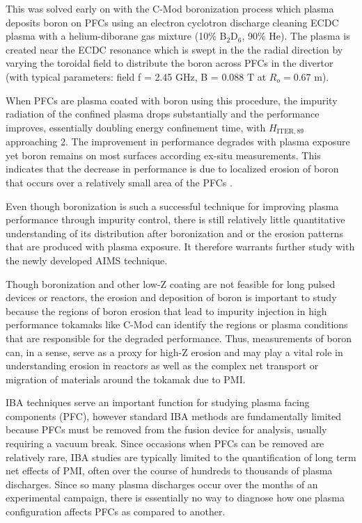 \documentclass[11pt,a4paper,twocolumn]{article}
\begin{document}
This was solved early on with the C-Mod boronization process which plasma deposits boron on PFCs using an electron cyclotron discharge cleaning ECDC plasma with a helium-diborane gas mixture (10\% B$_2$D$_6$, 90\% He). The plasma is created near the ECDC resonance which is swept in the the radial direction by varying the toroidal field to distribute the boron across PFCs in the divertor (with typical parameters: field f = 2.45 GHz, B = 0.088 T at $R_o = 0.67$ m).

When PFCs are plasma coated with boron using this procedure, the impurity radiation of the confined plasma drops substantially and the performance improves, essentially doubling energy confinement time, with $H_\mathrm{ITER,89}$ approaching 2.  The improvement in performance degrades with plasma exposure yet boron remains on most surfaces according ex-situ measurements.  This indicates that the decrease in performance is due to localized erosion of boron that occurs over a relatively small area of the PFCs \cite{WWoBoronization}.

Even though boronization is such a successful technique for improving plasma performance through impurity control, there is still relatively little quantitative understanding of its distribution after boronization and or the erosion patterns that are produced with plasma exposure.  It therefore warrants further study with the newly developed AIMS technique.  

Though boronization and other low-Z coating are not feasible for long pulsed devices or reactors, the erosion and deposition of boron is important to study because the regions of boron erosion that lead to impurity injection in high performance tokamaks like C-Mod can identify the regions or plasma conditions that are responsible for the degraded performance.  Thus, measurements of boron can, in a sense, serve as a proxy for high-Z erosion and may play a vital role in understanding erosion in reactors as well as the complex net transport or migration of materials around the tokamak due to PMI.












IBA techniques serve an important function for studying plasma facing components (PFC), however standard IBA methods are fundamentally limited because PFCs must be removed from the fusion device for analysis, usually requiring a vacuum break.  Since occasions when PFCs can be removed are relatively rare, IBA studies are typically limited to the quantification of long term net effects of PMI, often over the course of hundreds to thousands of plasma discharges.  Since so many plasma discharges occur over the months of an experimental campaign, there is essentially no way to diagnose how one plasma configuration affects PFCs as compared to another.
\end{document}
